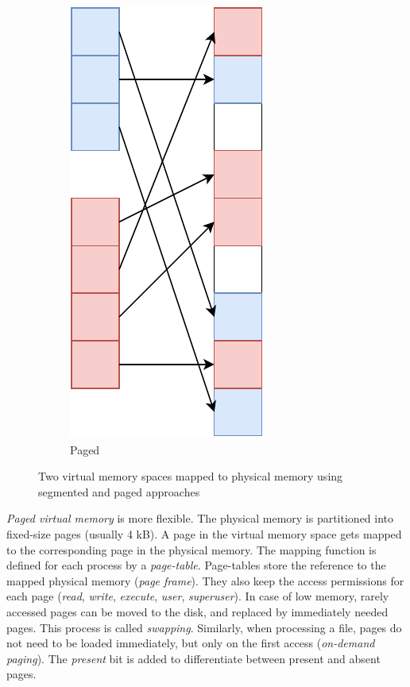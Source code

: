 \begin{figure}
\begin{subfigure}[]{.45\linewidth}
    \includegraphics[width=.5\linewidth]{img/paged.pdf}
    \caption{Paged}
  \end{subfigure}

  \caption{Two virtual memory spaces mapped to physical memory using segmented
  and paged approaches}
\end{figure}

\emph{Paged virtual memory} is more flexible. The physical memory is partitioned
into fixed-size pages (usually 4 kB). A page in the virtual memory space gets
mapped to the corresponding page in the physical memory. The mapping function is
defined for each process by a \emph{page-table}. Page-tables store the reference
to the mapped physical memory (\emph{page frame}). They also keep the access
permissions for each page (\emph{read}, \emph{write}, \emph{execute},
\emph{user}, \emph{superuser}). In case of low memory, rarely accessed pages can
be moved to the disk, and replaced by immediately needed pages. This process is
called \emph{swapping}. Similarly, when processing a file, pages do not need to
be loaded immediately, but only on the first access (\emph{on-demand paging}).
The \emph{present} bit is added to differentiate between present and absent
pages.

